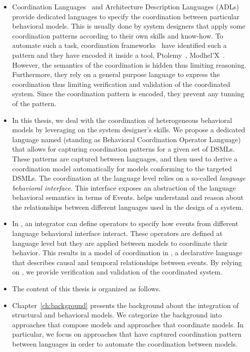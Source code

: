 \begin{itemize}
	\item Coordination Languages~\cite{coordsignibib} and Architecture Description Languages (ADLs)~\cite{frameadlsbib} provide dedicated languages to specify the coordination between particular behavioral models. This is usually done by system designers that apply some coordination patterns according to their own skills and know-how. To automate such a task, coordination frameworks~\cite{ptoleframebib,modhelxbib} have identified such a pattern and they have encoded it inside a tool, \eg Ptolemy~\cite{ptoleframebib}, Modhel'X~\cite{modhelxbib}. However, the semantics of the coordination is hidden thus limiting reasoning. Furthermore, they rely on a general purpose language to express the coordination thus limiting verification and validation of the coordinated system. Since the coordination pattern is encoded, they prevent any tunning of the pattern.   
	
\item In this thesis, we deal with the coordination of heterogeneous behavioral models by leveraging on the system designer's skills. We propose a dedicated language named \bcool (standing as Behavioral Coordination Operator Language) that allows for capturing coordination patterns for a given set of DSMLs. These patterns are captured between languages, and then used to derive a coordination model automatically for models conforming to the targeted DSMLs. The coordination at the language level relies on a so-called \emph{language behavioral interface}. This interface exposes an abstraction of the language behavioral semantics in terms of Events. \bcool helps understand and reason about the relationships between different languages used in the design of a system.  

\item In \bcool, an integrator can define operators to specify how events from different language behavioral interface interact. These operators are defined at language level but they are applied between models to coordinate their behavior. This results in a model of coordination in \ccsl, a declarative language that describes causal and temporal relationships between events. By relying on \ccsl, we provide verification and validation of the coordinated system.    

\item The content of this thesis is organized as follows. 

\item Chapter~\ref{ch:background} presents the background about the integration of structural and behavioral models. We categorize the background into approaches that compose models and approaches that coordinate models. In particular, we focus on approaches that have captured coordination pattern between languages in order to automate the coordination between models.   


\end{itemize}
